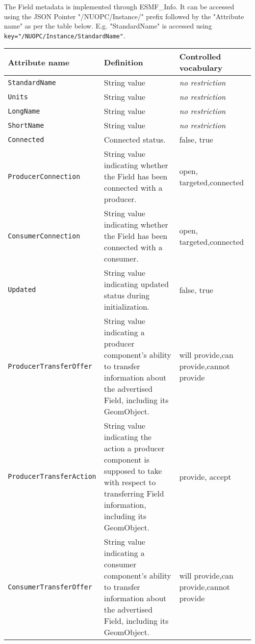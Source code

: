 \label{FieldMeta}
The Field metadata is implemented through ESMF\_Info. It can be accessed
using the JSON Pointer "/NUOPC/Instance/" prefix followed by the "Attribute name"
as per the table below. E.g. "StandardName" is accessed using {\tt key="/NUOPC/Instance/StandardName"}.

\begin{longtable}{|p{}|p{}|p{}|}
     \hline\hline
     {\bf Attribute name} & {\bf Definition} & {\bf Controlled vocabulary}\\
     \hline\hline
     {\tt StandardName} & String value & {\em no restriction}\\ \hline
     {\tt Units} & String value & {\em no restriction}\\ \hline
     {\tt LongName} & String value & {\em no restriction}\\ \hline
     {\tt ShortName} & String value & {\em no restriction}\\ \hline
     {\tt Connected} & Connected status.& false, true\\ \hline
     {\tt ProducerConnection} & String value indicating whether the Field has been connected with a producer. & open, targeted,\newline connected\\ \hline
     {\tt ConsumerConnection} & String value indicating whether the Field has been connected with a consumer.& open, targeted,\newline connected\\ \hline
     {\tt Updated} & String value indicating updated status during initialization.& false, true\\ \hline
     {\tt ProducerTransferOffer} & String value indicating a producer component's ability to transfer information about the advertised Field, including its GeomObject.& will provide,\newline can provide,\newline cannot provide\\ \hline
     {\tt ProducerTransferAction} & String value indicating the action a producer component is supposed to take with respect to transferring Field information, including its GeomObject.& provide, accept\\ \hline
     {\tt ConsumerTransferOffer} & String value indicating a consumer component's ability to transfer information about the advertised Field, including its GeomObject.& will provide,\newline can provide,\newline cannot provide\\ \hline

\end{longtable}
